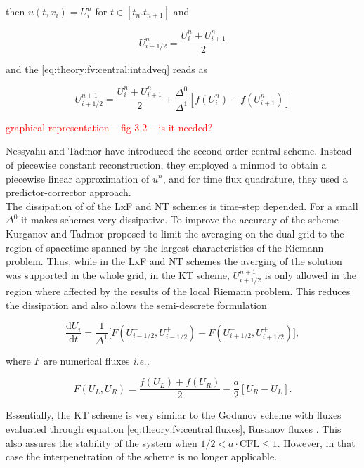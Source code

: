 \documentclass[11pt,a4paper,headinclude=true,DIV=14,BCOR=8mm,chapterprefix,listof=totoc,twoside,openright,abstracton]{scrbook}
\begin{document}
then $u(t,x_i) = U_{i}^{n}$ for $t\in[t_n. t_{n+1}]$ and 

\begin{equation}
    U_{i+1/2}^{n} = \frac{U_i ^n + U_{i+1}^n}{2}
\end{equation}

and the \ref{eq:theory:fv:central:intadveq} reads as

\begin{equation}
    U_{i+1/2}^{n+1} = \frac{U_i ^n + U_{i+1}^n}{2} + \frac{\Delta^0}{\Delta^1}[f(U_i ^n) - f(U_{i+1} ^n)]
\end{equation}

\textcolor{red}{graphical representation -- fig 3.2 -- is it needed?}

Nessyahu and Tadmor \cite{Nessyahu:1990} have introduced the second order central scheme. Instead of piecewise constant reconstruction, they employed a minmod to obtain a piecewise linear approximation of $u^n$, and for time flux quadrature, they used a predictor-corrector approach. \\

The dissipation of of the LxF and NT schemes is time-step depended. For a small $\Delta^0$ it makes schemes very dissipative. To improve the accuracy of the scheme Kurganov and Tadmor \cite{Kurganov:2000} proposed to limit the averaging on the dual grid to the region of spacetime spanned by the largest characteristics of the Riemann problem. Thus, while in the LxF and NT schemes the averging of the solution was supported in the whole grid, in the KT scheme, $U^{n+1}_{i+1/2}$ is only allowed in the region where affected by the results of the local Riemann problem. This reduces the dissipation and also allows the semi-descrete formulation 

\begin{equation}
    \frac{\text{d} U_i}{\text{d} t} = \frac{1}{\Delta^{1}}\big[F(U_{i-1/2}^{-},U_{i-1/2}^{+}) - F(U_{i+1/2}^{-},U_{i+1/2}^{+})\big],
\end{equation}

where $F$ are numerical fluxes \textit{i.e.,}

\begin{equation}
    F(U_L, U_R) = \frac{f(U_L) + f(U_R)}{2} - \frac{a}{2}[U_R - U_L].
    \label{eq:theory:fv:central:fluxes}
\end{equation}

Essentially, the KT scheme is very similar to the Godunov scheme with fluxes evaluated through equation \ref{eq:theory:fv:central:fluxes}, Rusanov fluxes \cite{Kurganov:2000}. This also assures the stability of the system when $1/2 < a \cdot \text{CFL} \leq 1$. However, in that case the interpenetration of the scheme is no longer applicable. \\
\end{document}
